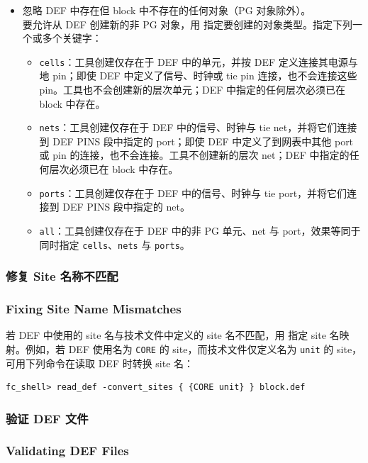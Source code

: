 \begin{itemize}
  \item 忽略 DEF 中存在但 block 中不存在的任何对象（PG 对象除外）。\\
    要允许从 DEF 创建新的非 PG 对象，用  指定要创建的对象类型。指定下列一个或多个关键字：
    \begin{itemize}
      \item \texttt{cells}：工具创建仅存在于 DEF 中的单元，并按 DEF 定义连接其电源与地 pin；即使 DEF 中定义了信号、时钟或 tie pin 连接，也不会连接这些 pin。工具也不会创建新的层次单元；DEF 中指定的任何层次必须已在 block 中存在。
      \item \texttt{nets}：工具创建仅存在于 DEF 中的信号、时钟与 tie net，并将它们连接到 DEF PINS 段中指定的 port；即使 DEF 中定义了到网表中其他 port 或 pin 的连接，也不会连接。工具不创建新的层次 net；DEF 中指定的任何层次必须已在 block 中存在。
      \item \texttt{ports}：工具创建仅存在于 DEF 中的信号、时钟与 tie port，并将它们连接到 DEF PINS 段中指定的 net。
      \item \texttt{all}：工具创建仅存在于 DEF 中的非 PG 单元、net 与 port，效果等同于同时指定 \texttt{cells}、\texttt{nets} 与 \texttt{ports}。
    \end{itemize}
\end{itemize}

\subsubsection{修复 Site 名称不匹配}
\subsubsection*{Fixing Site Name Mismatches}

若 DEF 中使用的 site 名与技术文件中定义的 site 名不匹配，用  指定 site 名映射。例如，若 DEF 使用名为 \texttt{CORE} 的 site，而技术文件仅定义名为 \texttt{unit} 的 site，可用下列命令在读取 DEF 时转换 site 名：
\begin{lstlisting}
fc_shell> read_def -convert_sites { {CORE unit} } block.def
\end{lstlisting}

\subsubsection{验证 DEF 文件}
\subsubsection*{Validating DEF Files}

